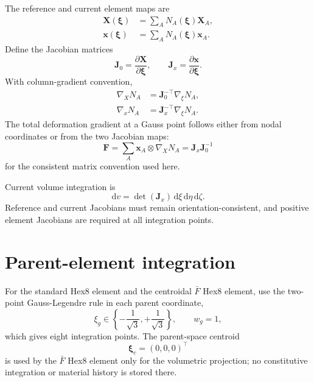 \documentclass[11pt,a4paper]{article}
\newcommand{\bs}[1]{\boldsymbol{#1}}
\newcommand{\dd}{\mathrm{d}}
\newcommand{\F}{\bs{F}}
\newcommand{\vct}[1]{\mathbf{#1}}
\begin{document}
The reference and current element maps are
\begin{align}
\bs{X}(\bs{\xi})
&=\sum_A N_A(\bs{\xi})\bs{X}_A,
\\
\bs{x}(\bs{\xi})
&=\sum_A N_A(\bs{\xi})\bs{x}_A.
\end{align}
Define the Jacobian matrices
\begin{equation}
\vct{J}_0
=
\frac{\partial\bs{X}}{\partial\bs{\xi}},
\qquad
\vct{J}_x
=
\frac{\partial\bs{x}}{\partial\bs{\xi}}.
\label{eq:element-jacobians}
\end{equation}
With column-gradient convention,
\begin{align}
\nabla_X N_A&=\vct{J}_0^{-\top}\nabla_{\xi}N_A,
\label{eq:grad-ref}
\\
\nabla_x N_A&=\vct{J}_x^{-\top}\nabla_{\xi}N_A.
\label{eq:grad-current}
\end{align}
The total deformation gradient at a Gauss point follows either from nodal coordinates or from the two Jacobian maps:
\begin{equation}
\boxed{
\F
=
\sum_A\bs{x}_A\otimes\nabla_XN_A
=
\vct{J}_x\vct{J}_0^{-1}
}
\label{eq:F-element}
\end{equation}
for the consistent matrix convention used here.

Current volume integration is
\begin{equation}
\dd v=\det(\vct{J}_x)\,\dd\xi\,\dd\eta\,\dd\zeta.
\end{equation}
Reference and current Jacobians must remain orientation-consistent, and positive element Jacobians are required at all integration points.

\section{Parent-element integration}

For the standard Hex8 element and the centroidal $\bar F$ Hex8 element, use the two-point Gauss-Legendre rule in each parent coordinate,
\begin{equation}
\xi_g\in\left\{-\frac{1}{\sqrt{3}},+\frac{1}{\sqrt{3}}\right\},
\qquad
w_g=1,
\end{equation}
which gives eight integration points. The parent-space centroid
\begin{equation}
\bs{\xi}_c=(0,0,0)^\top
\end{equation}
is used by the $\bar F$ Hex8 element only for the volumetric projection; no constitutive integration or material history is stored there.
\end{document}
